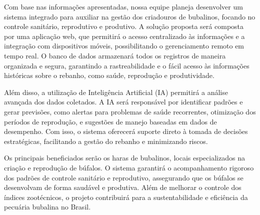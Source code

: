 Com base nas informações apresentadas, nossa equipe planeja desenvolver um sistema integrado para auxiliar na gestão dos criadouros de bubalinos, focando no controle sanitário, reprodutivo e produtivo. A solução proposta será composta por uma aplicação web, que permitirá o acesso centralizado às informações e a integração com dispositivos móveis, possibilitando o gerenciamento remoto em tempo real. O banco de dados armazenará todos os registros de maneira organizada e segura, garantindo a rastreabilidade e o fácil acesso às informações históricas sobre o rebanho, como saúde, reprodução e produtividade.

Além disso, a utilização de Inteligência Artificial (IA) permitirá a análise avançada dos dados coletados. A IA será responsável por identificar padrões e gerar previsões, como alertas para problemas de saúde recorrentes, otimização dos períodos de reprodução, e sugestões de manejo baseadas em dados de desempenho. Com isso, o sistema oferecerá suporte direto à tomada de decisões estratégicas, facilitando a gestão do rebanho e minimizando riscos.

Os principais beneficiados serão os haras de bubalinos, locais especializados na criação e reprodução de búfalos. O sistema garantirá o acompanhamento rigoroso dos padrões de controle sanitário e reprodutivo, assegurando que os búfalos se desenvolvam de forma saudável e produtiva. Além de melhorar o controle dos índices zootécnicos, o projeto contribuirá para a sustentabilidade e eficiência da pecuária bubalina no Brasil.